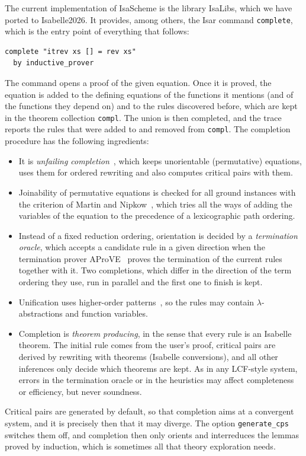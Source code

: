 \documentclass[preprint,12pt]{elsarticle}
\newcommand{\isa}[1]{\texttt{#1}}
\begin{document}
The current implementation of IsaScheme is the library IsaLibs, which we
have ported to Isabelle2026. It provides, among others, the Isar command
\isa{complete}, which is the entry point of everything that follows:
\begin{lstlisting}
complete "itrev xs [] = rev xs"
  by inductive_prover
\end{lstlisting}
The command opens a proof of the given equation. Once it is proved, the
equation is added to the defining equations of the functions it mentions
(and of the functions they depend on) and to the rules discovered before,
which are kept in the theorem collection \isa{compl}. The union is then
completed, and the trace reports the rules that were added to and removed
from \isa{compl}. The completion procedure has the following ingredients:
\begin{itemize}
  \item It is \emph{unfailing completion}~\cite{BachmairDershowitzPlaisted89},
        which keeps unorientable (permutative) equations, uses them for
        ordered rewriting and also computes critical pairs with them.
  \item Joinability of permutative equations is checked for all ground
        instances with the criterion of Martin and
        Nipkow~\cite{MartinNipkow90}, which tries all the ways of adding the
        variables of the equation to the precedence of a lexicographic path
        ordering.
  \item Instead of a fixed reduction ordering, orientation is decided by
        a \emph{termination oracle}, which accepts a candidate rule in a
        given direction when the termination prover
        AProVE~\cite{Giesl17,ArtsGiesl00} proves the termination of the
        current rules together with it. Two completions, which differ in
        the direction of the term ordering they use, run in parallel and
        the first one to finish is kept.
  \item Unification uses higher-order patterns~\cite{Miller91}, so the
        rules may contain $\lambda$-abstractions and function variables.
  \item Completion is \emph{theorem producing}, in the sense that every
        rule is an Isabelle theorem. The initial rule comes from the user's proof, critical
        pairs are derived by rewriting with theorems (Isabelle conversions),
        and all other inferences only decide which theorems are kept. As
        in any LCF-style system, errors in the termination oracle or in the
        heuristics may affect completeness or efficiency, but never
        soundness.
\end{itemize}
Critical pairs are generated by default, so that completion aims at a
convergent system, and it is precisely then that it may diverge. The option
\isa{generate\_cps} switches them off, and completion then only orients and
interreduces the lemmas proved by induction, which is sometimes all that
theory exploration needs.
\end{document}
